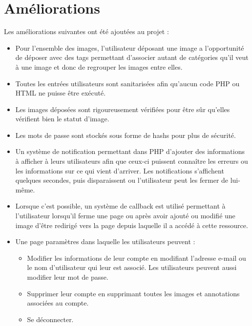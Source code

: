 \documentclass[a4paper, 12pt]{article}
\begin{document}
\section{Améliorations}

Les améliorations suivantes ont été ajoutées au projet :

\begin{itemize}
    \item Pour l'ensemble des images, l'utilisateur déposant une image a l'opportunité de déposer avec des tags permettant d'associer autant de catégories qu'il veut à une image et donc de regrouper les images entre elles.
    
    \item Toutes les entrées utilisateurs sont sanitarisées afin qu'aucun code PHP ou HTML ne puisse être exécuté.
    
    \item Les images déposées sont rigoureusement vérifiées pour être sûr qu'elles vérifient bien le statut d'image.
    
    \item Les mots de passe sont stockés sous forme de hashs pour plus de sécurité.
    
    \item Un système de notification permettant dans PHP d'ajouter des informations à afficher à leurs utilisateurs afin que ceux-ci puissent connaître les erreurs ou les informations sur ce qui vient d'arriver. Les notifications s'affichent quelques secondes, puis disparaissent ou l'utilisateur peut les fermer de lui-même.
    
    \item Lorsque c'est possible, un système de \og callback \fg est utilisé permettant à l'utilisateur lorsqu'il ferme une page ou après avoir ajouté ou modifié une image d'être redirigé vers la page depuis laquelle il a accédé à cette ressource.
    
    \item Une page paramètres dans laquelle les utilisateurs peuvent :
    \begin{itemize}
        \item Modifier les informations de leur compte en modifiant l'adresse e-mail ou le nom d'utilisateur qui leur est associé. Les utilisateurs peuvent aussi modifier leur mot de passe. 
        \item Supprimer leur compte en supprimant toutes les images et annotations associées au compte.
        \item Se déconnecter.
    \end{itemize}


\end{itemize}
\end{document}
